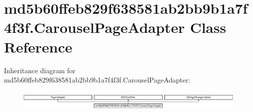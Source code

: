 \hypertarget{classmd5b60ffeb829f638581ab2bb9b1a7f4f3f_1_1CarouselPageAdapter}{}\section{md5b60ffeb829f638581ab2bb9b1a7f4f3f.\+Carousel\+Page\+Adapter Class Reference}
\label{classmd5b60ffeb829f638581ab2bb9b1a7f4f3f_1_1CarouselPageAdapter}
Inheritance diagram for md5b60ffeb829f638581ab2bb9b1a7f4f3f.\+Carousel\+Page\+Adapter\+:\begin{figure}[H]
\begin{center}
\leavevmode
\includegraphics[height=0.987654cm]{classmd5b60ffeb829f638581ab2bb9b1a7f4f3f_1_1CarouselPageAdapter}
\end{center}
\end{figure}
